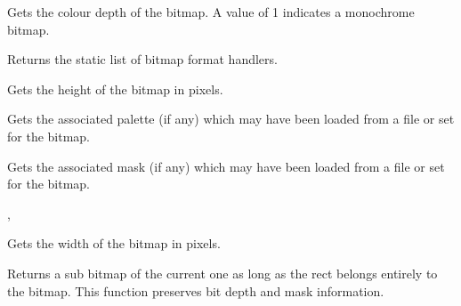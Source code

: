 Gets the colour depth of the bitmap. A value of 1 indicates a
monochrome bitmap.



Returns the static list of bitmap format handlers.



\label{wxbitmapgetheight}


Gets the height of the bitmap in pixels.

\label{wxbitmapgetpalette}


Gets the associated palette (if any) which may have been loaded from a file
or set for the bitmap.



\label{wxbitmapgetmask}


Gets the associated mask (if any) which may have been loaded from a file
or set for the bitmap.


, 

\label{wxbitmapgetwidth}


Gets the width of the bitmap in pixels.



\label{wxbitmapgetsubbitmap}


Returns a sub bitmap of the current one as long as the rect belongs entirely to
the bitmap. This function preserves bit depth and mask information.


